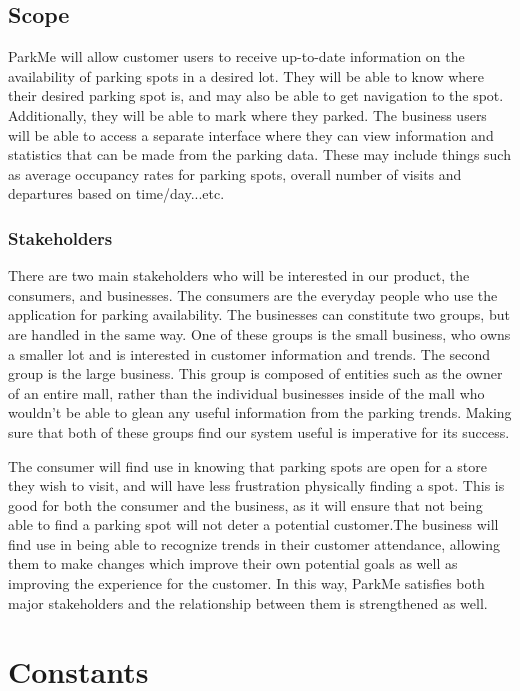 \documentclass[]{article}
\begin{document}
\subsection{Scope}
ParkMe will allow customer users to receive up-to-date information on the availability of parking spots in a desired lot. They will be able to know where their desired parking spot is, and may also be able to get navigation to the spot. Additionally, they will be able to mark where they parked.  The business users will be able to access a separate interface where they can view information and statistics that can be made from the parking data. These may include things such as average occupancy rates for parking spots, overall number of visits and departures based on time/day...etc.

\subsubsection{Stakeholders}
There are two main stakeholders who will be interested in our product, the consumers, and businesses. The consumers are the everyday people who use the application for parking availability. The businesses can constitute two groups, but are handled in the same way. One of these groups is the small business, who owns a smaller lot and is interested in customer information and trends. The second group is the large business. This group is composed of entities such as the owner of an entire mall, rather than the individual businesses inside of the mall who wouldn’t be able to glean any useful information from the parking trends. Making sure that both of these groups find our system useful is imperative for its success.

The consumer will find use in knowing that parking spots are open for a store they wish to visit, and will have less frustration physically finding a spot. This is good for both the consumer and the business, as it will ensure that not being able to find a parking spot will not deter a potential customer.The business will find use in being able to recognize trends in their customer attendance, allowing them to make changes which improve their own potential goals as well as improving the experience for the customer. In this way, ParkMe satisfies both major stakeholders and the relationship between them is strengthened as well.

\section{Constants}
\end{document}
